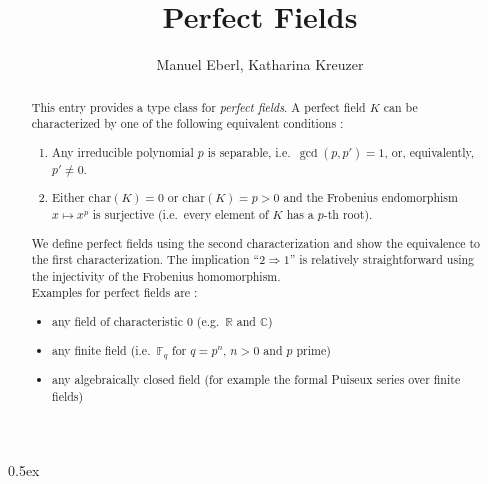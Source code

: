 \documentclass[11pt,a4paper]{article}
\begin{document}
\title{Perfect Fields}
\author{Manuel Eberl, Katharina Kreuzer}
\maketitle

\begin{abstract}
This entry provides a type class for \emph{perfect fields}. 
A perfect field $K$ can be characterized by one of the following equivalent conditions \cite{wiki:perfect_field}:
\begin{enumerate}
\item Any irreducible polynomial $p$ is separable, i.e.\ $\gcd(p,p') = 1$, or, equivalently, $p' \neq 0$.
\item Either $\text{char}(K) = 0$ or $\text{char}(K) = p > 0$ and the Frobenius endomorphism $x \mapsto x^p$ is surjective (i.e.\ every element of $K$ has a $p$-th root).
\end{enumerate}
We define perfect fields using the second characterization and show the equivalence to the first characterization.
The implication ``$2 \Rightarrow 1$'' is relatively straightforward using the injectivity of the Frobenius homomorphism.\\

\noindent Examples for perfect fields are \cite{wiki:perfect_field}:
\begin{itemize}
\item any field of characteristic $0$ (e.g.\ $\mathbb{R}$ and $\mathbb{C}$)
\item any finite field (i.e.\ $\mathbb{F}_q$ for $q=p^n$, $n > 0$ and $p$ prime)
\item any algebraically closed field (for example the formal Puiseux series over finite fields)
\end{itemize}
\end{abstract}


\newpage
\tableofcontents

\newpage
\parindent 0pt\parskip 0.5ex



\raggedright


\end{document}

